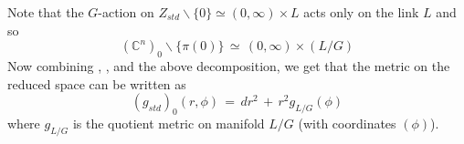 \documentclass[a4paper,12pt]{article}
\newcommand{\C}{\mathbb{C}}
\begin{document}
	Note that the $G$-action on $Z_{std}\backslash\{0\} \simeq (0,\infty) \times L$ acts only on the link $L$ and so 
	\begin{equation}
		(\C^n)_0\backslash\{\pi(0)\} \,\simeq\, (0,\infty) \times (L/G)
	\end{equation}
	Now combining , , and the above decomposition, we get that the metric on the reduced space can be written as
	\begin{equation}\label{standardquotientmetric}
		(g_{std})_0(r,\phi) \,=\, dr^2 \,+\, r^2 g_{L/G}(\phi)
	\end{equation}
	where $g_{L/G}$ is the quotient metric on manifold $L/G$ (with coordinates $(\phi)$).
\end{document}
